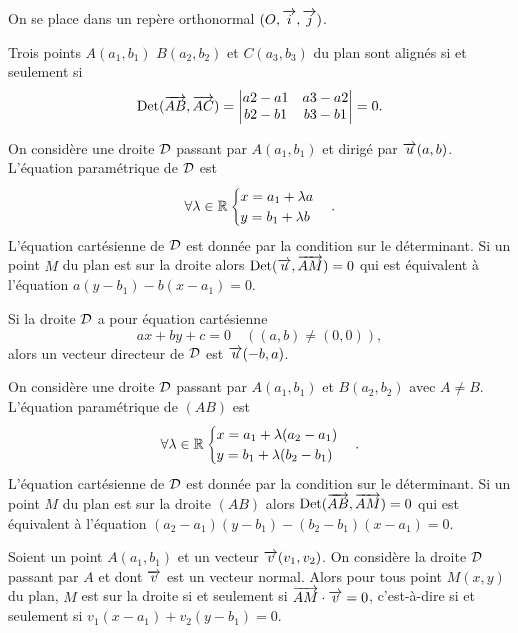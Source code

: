 On se place dans un repère orthonormal \((O,\overrightarrow{i},\overrightarrow{j})\).
\begin{prop}
Trois points \(A(a_1,b_1)\) \(B(a_2,b_2)\) et \(C(a_3,b_3)\) du plan sont alignés si et seulement si
\begin{equation}
  \operatorname{Det}(\overrightarrow{AB},\overrightarrow{AC})=
  \begin{vmatrix}
    a2-a1&a3-a2\\
    b2-b1&b3-b1
  \end{vmatrix} =0.
\end{equation}
\end{prop}
\begin{prop}
On considère une droite \(\mathcal{D}\) passant par \(A(a_1,b_1)\) et dirigé par \(\overrightarrow{u}(a,b)\). L'équation paramétrique de \(\mathcal{D}\) est
\begin{equation}
 \forall \lambda \in \mathbb{R} \begin{cases} x=a_1+\lambda a \\ y=b_1+ \lambda b\end{cases}. 
\end{equation}
L'équation cartésienne de \(\mathcal{D}\) est donnée par la condition sur le déterminant. Si un point \(M\) du plan est sur la droite alors \(\operatorname{Det}(\overrightarrow{u},\overrightarrow{AM})=0\) qui est équivalent à l'équation \(a(y-b_1)-b(x-a_1)=0\).
\end{prop}
Si la droite \(\mathcal{D}\) a pour équation cartésienne
\begin{equation}
 ax+by+c=0 \quad ((a,b) \neq (0,0)),
\end{equation}
alors un vecteur directeur de \(\mathcal{D}\) est \(\overrightarrow{u}(-b,a)\).
\begin{prop}
  On considère une droite \(\mathcal{D}\) passant par \(A(a_1,b_1)\) et \(B(a_2,b_2)\) avec \(A \neq B\). L'équation paramétrique de \((AB)\) est
  \begin{equation}
    \forall \lambda \in \mathbb{R} \begin{cases} x=a_1+\lambda (a_2-a_1) \\ y=b_1+ \lambda (b_2-b_1)\end{cases}.
  \end{equation}
L'équation cartésienne de \(\mathcal{D}\) est donnée par la condition sur le déterminant. Si un point \(M\) du plan est sur la droite \((AB)\) alors \(\operatorname{Det}(\overrightarrow{AB},\overrightarrow{AM})=0\) qui est équivalent à l'équation \((a_2-a_1)(y-b_1)-(b_2-b_1)(x-a_1)=0\).
\end{prop}
\begin{prop}
  Soient un point \(A(a_1,b_1)\) et un vecteur \(\overrightarrow{v}(v_1,v_2)\). On considère la droite \(\mathcal{D}\) passant par \(A\) et dont \(\overrightarrow{v}\) est un vecteur normal. Alors pour tous point \(M(x,y)\) du plan, \(M\) est sur la droite si et seulement si \(\overrightarrow{AM}\cdot\overrightarrow{v}=0\), c'est-à-dire si et seulement si \(v_1(x-a_1)+v_2(y-b_1)=0\).
\end{prop}
